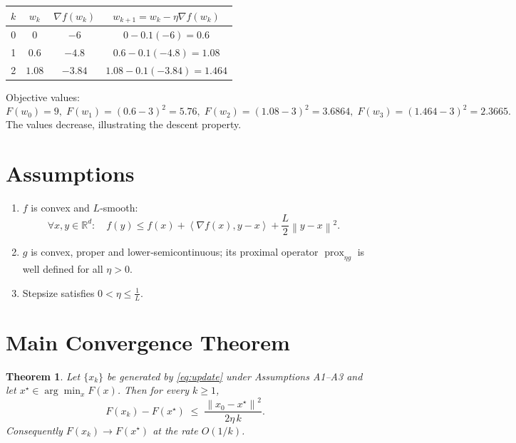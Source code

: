 \documentclass{article}
\newtheorem{theorem}{Theorem}
\newcommand{\prox}{\operatorname{prox}}
\newcommand{\grad}{\nabla}
\newcommand{\R}{\mathbb{R}}
\newcommand{\norm}[1]{\left\lVert #1 \right\rVert}
\newcommand{\inner}[2]{\left\langle #1,#2 \right\rangle}
\begin{document}
\begin{center}
\begin{tabular}{c|c|c|c}
$k$ & $w_{k}$ & $\grad f(w_{k})$ & $w_{k+1}=w_{k}-\eta\grad f(w_{k})$ \\ \hline
0 & $0$ & $-6$ & $0-0.1(-6)=0.6$ \\
1 & $0.6$ & $-4.8$ & $0.6-0.1(-4.8)=1.08$ \\
2 & $1.08$ & $-3.84$ & $1.08-0.1(-3.84)=1.464$ \\
\end{tabular}
\end{center}
Objective values:
\[
F(w_{0})=9,\;F(w_{1})=(0.6-3)^{2}=5.76,\;F(w_{2})=(1.08-3)^{2}=3.6864,\;F(w_{3})=(1.464-3)^{2}=2.3665.
\]
The values decrease, illustrating the descent property.

\newpage
\section*{Assumptions}
\begin{enumerate}[label=\textbf{A\arabic*}:,noitemsep]
\item $f$ is convex and $L$‑smooth:
\[
\forall x,y\in\R^{d}:\quad 
f(y)\le f(x)+\inner{\grad f(x)}{y-x}+\frac{L}{2}\norm{y-x}^{2}.
\tag{A1}
\]
\item $g$ is convex, proper and lower‑semicontinuous; its proximal operator $\prox_{\eta g}$ is well defined for all $\eta>0$.
\item Stepsize satisfies $0<\eta\le \frac{1}{L}$.
\end{enumerate}

\section*{Main Convergence Theorem}
\begin{theorem}\label{thm:rate}
Let $\{x_{k}\}$ be generated by \eqref{eq:update} under Assumptions A1–A3 and let $x^{\star}\in\arg\min_{x}F(x)$. Then for every $k\ge1$,
\begin{equation}\label{eq:rate}
F(x_{k})-F(x^{\star})\;\le\;\frac{\norm{x_{0}-x^{\star}}^{2}}{2\eta\,k}.
\end{equation}
Consequently $F(x_{k})\to F(x^{\star})$ at the rate $O(1/k)$. 
\end{theorem}
\end{document}
